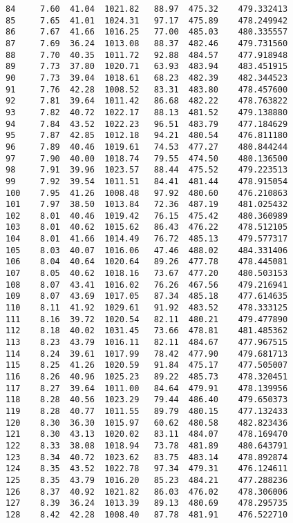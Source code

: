 \documentclass[11pt]{article}
\begin{document}
\begin{tcolorbox}[breakable, size=fbox, boxrule=.5pt, pad at break*=1mm, opacityfill=0]
\begin{Verbatim}[commandchars=\\\{\}]
84     7.60  41.04  1021.82   88.97  475.32    479.332413
85     7.65  41.01  1024.31   97.17  475.89    478.249942
86     7.67  41.66  1016.25   77.00  485.03    480.335557
87     7.69  36.24  1013.08   88.37  482.46    479.731560
88     7.70  40.35  1011.72   92.88  484.57    477.918948
89     7.73  37.80  1020.71   63.93  483.94    483.451915
90     7.73  39.04  1018.61   68.23  482.39    482.344523
91     7.76  42.28  1008.52   83.31  483.80    478.457600
92     7.81  39.64  1011.42   86.68  482.22    478.763822
93     7.82  40.72  1022.17   88.13  481.52    479.138880
94     7.84  43.52  1022.23   96.51  483.79    477.184629
95     7.87  42.85  1012.18   94.21  480.54    476.811180
96     7.89  40.46  1019.61   74.53  477.27    480.844244
97     7.90  40.00  1018.74   79.55  474.50    480.136500
98     7.91  39.96  1023.57   88.44  475.52    479.223513
99     7.92  39.54  1011.51   84.41  481.44    478.915054
100    7.95  41.26  1008.48   97.92  480.60    476.210863
101    7.97  38.50  1013.84   72.36  487.19    481.025432
102    8.01  40.46  1019.42   76.15  475.42    480.360989
103    8.01  40.62  1015.62   86.43  476.22    478.512105
104    8.01  41.66  1014.49   76.72  485.13    479.577317
105    8.03  40.07  1016.06   47.46  488.02    484.331406
106    8.04  40.64  1020.64   89.26  477.78    478.445081
107    8.05  40.62  1018.16   73.67  477.20    480.503153
108    8.07  43.41  1016.02   76.26  467.56    479.216941
109    8.07  43.69  1017.05   87.34  485.18    477.614635
110    8.11  41.92  1029.61   91.92  483.52    478.333125
111    8.16  39.72  1020.54   82.11  480.21    479.477890
112    8.18  40.02  1031.45   73.66  478.81    481.485362
113    8.23  43.79  1016.11   82.11  484.67    477.967515
114    8.24  39.61  1017.99   78.42  477.90    479.681713
115    8.25  41.26  1020.59   91.84  475.17    477.505007
116    8.26  40.96  1025.23   89.22  485.73    478.320451
117    8.27  39.64  1011.00   84.64  479.91    478.139956
118    8.28  40.56  1023.29   79.44  486.40    479.650373
119    8.28  40.77  1011.55   89.79  480.15    477.132433
120    8.30  36.30  1015.97   60.62  480.58    482.823436
121    8.30  43.13  1020.02   83.11  484.07    478.169470
122    8.33  38.08  1018.94   73.78  481.89    480.643791
123    8.34  40.72  1023.62   83.75  483.14    478.892874
124    8.35  43.52  1022.78   97.34  479.31    476.124611
125    8.35  43.79  1016.20   85.23  484.21    477.288236
126    8.37  40.92  1021.82   86.03  476.02    478.306006
127    8.39  36.24  1013.39   89.13  480.69    478.295735
128    8.42  42.28  1008.40   87.78  481.91    476.522710

\end{Verbatim}
\end{tcolorbox}
\end{document}
